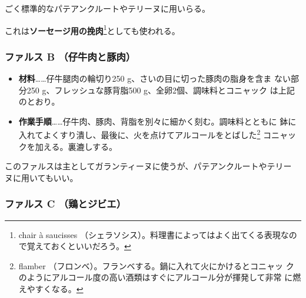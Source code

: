 \begin{recette}
ごく標準的なパテアンクルートやテリーヌに用いらる。

これは\textbf{ソーセージ用の挽肉}\footnote{chair à saucisses
  （シェラソシス）。料理書によってはよく出てくる表現なので覚えておくといいだろう。}としても使われる。

\maeaki

\hypertarget{farce-froide-b}{%
\subsubsection{ファルス B （仔牛肉と豚肉）}\label{farce-froide-b}}



\begin{itemize}
\item
  \textbf{材料}\ldots{}\ldots{}仔牛腿肉の輪切り250
  g、さいの目に切った豚肉の脂身を含ま ない部分250
  g、フレッシュな豚背脂500 g、全卵2個、調味料とコニャック
  は上記のとおり。
\item
  \textbf{作業手順}\ldots{}\ldots{}仔牛肉、豚肉、背脂を別々に細かく刻む。調味料とともに
  鉢に入れてよくすり潰し、最後に、火を点けてアルコールをとばした\footnote{flamber
    （フロンベ）。フランベする。鍋に入れて火にかけるとコニャッ
    クのようにアルコール度の高い酒類はすぐにアルコール分が揮発して非常
    に燃えやすくなる。} コニャックを加える。裏漉しする。
\end{itemize}

このファルスは主としてガランティーヌに使うが、パテアンクルートやテリー
ヌに用いてもいい。

\hypertarget{farce-froide-c}{%
\subsubsection{ファルス C （鶏とジビエ）}\label{farce-froide-c}}




\end{recette}

